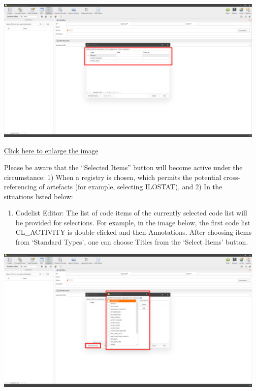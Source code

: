 \documentclass[
]{book}
\providecommand{\tightlist}{%
  \setlength{\itemsep}{0pt}\setlength{\parskip}{0pt}}
\begin{document}
\begin{center}\includegraphics[width=1\linewidth]{./images/image7} \end{center}

\href{images/image7.png}{Click here to enlarge the image}

Please be aware that the ``Selected Items'' button will become active under the circumstance: 1) When a registry is chosen, which permits the potential cross-referencing of artefacts (for example, selecting ILOSTAT), and 2) In the situations listed below:

\begin{enumerate}
\def\labelenumi{\arabic{enumi}.}
\tightlist
\item
  Codelist Editor: The list of code items of the currently selected code list will be provided for selections. For example, in the image below, the first code list CL\_ACTIVITY is double-clicked and then Annotations. After choosing items from `Standard Types', one can choose Titles from the `Select Items' button.
\end{enumerate}

\begin{center}\includegraphics[width=1\linewidth]{./images/image8} \end{center}
\end{document}
